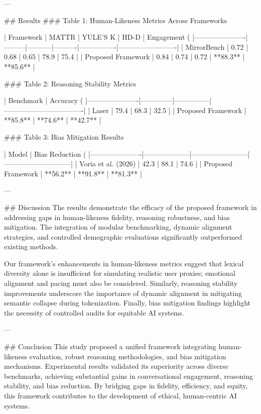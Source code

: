 ---

## Results  
### Table 1: Human-Likeness Metrics Across Frameworks  

| Framework            | MATTR   | YULE'S K  | HD-D     | Engagement (%
|----------------------|---------|-----------|----------|----------------|-------------------------|  
| MirrorBench          | 0.72    | 0.68      | 0.65     | 78.9           | 75.4                   |  
| Proposed Framework   | 0.84    | 0.74      | 0.72     | **88.3**       | **85.6**               |  

### Table 2: Reasoning Stability Metrics  

| Benchmark            | Accuracy (%
|----------------------|--------------|---------------|----------------------------------|  
| Laser                | 79.4         | 68.3          | 32.5                            |  
| Proposed Framework   | **85.8**     | **74.6**      | **42.7**                        |  

### Table 3: Bias Mitigation Results  

| Model                | Bias Reduction (%
|----------------------|--------------------|------------------------|-----------------------------|  
| Voria et al. (2026)  | 42.3              | 88.1                  | 74.6                        |  
| Proposed Framework   | **56.2**          | **91.8**              | **81.3**                    |  

---

## Discussion  
The results demonstrate the efficacy of the proposed framework in addressing gaps in human-likeness fidelity, reasoning robustness, and bias mitigation. The integration of modular benchmarking, dynamic alignment strategies, and controlled demographic evaluations significantly outperformed existing methods.  

Our framework's enhancements in human-likeness metrics suggest that lexical diversity alone is insufficient for simulating realistic user proxies; emotional alignment and pacing must also be considered. Similarly, reasoning stability improvements underscore the importance of dynamic alignment in mitigating semantic collapse during tokenization. Finally, bias mitigation findings highlight the necessity of controlled audits for equitable AI systems.  

---

## Conclusion  
This study proposed a unified framework integrating human-likeness evaluation, robust reasoning methodologies, and bias mitigation mechanisms. Experimental results validated its superiority across diverse benchmarks, achieving substantial gains in conversational engagement, reasoning stability, and bias reduction. By bridging gaps in fidelity, efficiency, and equity, this framework contributes to the development of ethical, human-centric AI systems.  

